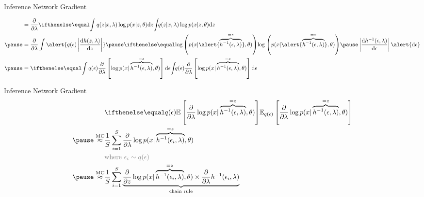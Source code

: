 \documentclass[14pt, aspectratio=169]{beamer}
\begin{document}
\begin{frame}{Inference Network Gradient}

\begin{equation*}
\begin{aligned}
&= \pdv{\lambda} \intl{q(z|x,\lambda)\log p(x|z,\theta)}{z} \\ \pause
&= \pdv{\lambda} \int \alert{q(\epsilon)\left|\dv{h(z,\lambda)}{z}\right|} \pause \loga{ p(x | \alert{\overbrace{h^{-1}(\epsilon, \lambda)}^{=z}},\theta)}\pause\left|\dv{h^{-1}(\epsilon,\lambda)}{\epsilon}\right|{\alert{\dd\epsilon}} \\ \pause
&= \intl{q(\epsilon) \pdv{\lambda} \left[ \log p(x| \overbrace{h^{-1}(\epsilon, \lambda)}^{=z}, \theta)\right] }{\epsilon}
\end{aligned}
\end{equation*}
\end{frame}

\begin{frame}{Inference Network Gradient}
\vspace{-10pt}
\begin{equation*}
\begin{aligned}
&\E[q(\epsilon)]{\pdv{\lambda} \log p(x| \overbrace{h^{-1}(\epsilon, \lambda)}^{=z}, \theta)} \\ \pause
\overset{\text{MC}}{\approx} &\frac{1}{S}\sum_{i=1}^{S} \pdv{\lambda} \log p(x| \overbrace{h^{-1}(\epsilon_i, \lambda)}^{=z}, \theta) \\
&\textcolor{gray}{\text{where }\epsilon_i \sim q(\epsilon)} \\ \pause
\overset{\text{MC}}{\approx} &\frac{1}{S}\sum_{i=1}^{S} \underbrace{\pdv{z} \log p(x| \overbrace{h^{-1}(\epsilon_i, \lambda)}^{=z}, \theta) \times \pdv{\lambda} h^{-1}(\epsilon_i, \lambda)}_{\text{chain rule}}
\end{aligned}
\end{equation*}
\end{frame}
\end{document}
